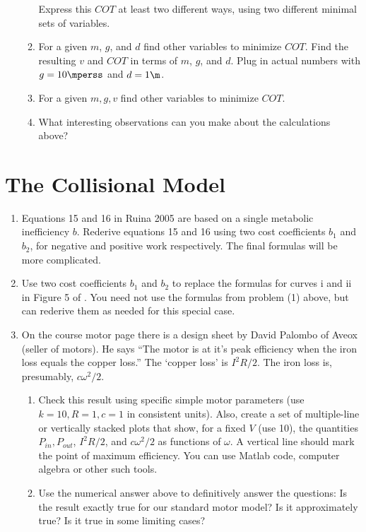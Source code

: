 \begin{enumerate}
\begin{enumerate}
Express this $COT$ at least two different ways, using two different minimal sets
of variables.

\item  For a given $m$, $g$, and $d$ find other variables to minimize $COT$. Find
the resulting $v$ and $COT$ in terms of $m$, $g$, and $d$. Plug in actual numbers with
$g= 10\mperss$ and $d=1\m$.

\item For a given $m,g,v$ find other variables to minimize $COT$. 

\item What interesting observations can you make about the calculations
above?

\end{enumerate}
\end{enumerate}

\newpage
\section{The Collisional Model}

\begin{enumerate}
\item  Equations 15 and 16 in Ruina 2005 \cite{ruina05} are based on a single metabolic inefficiency $b$. Rederive equations 15 and 16 using two cost coefficients $b_1$ and $b_2$, for negative and positive work respectively. The final formulas will be more complicated.

\item Use two cost coefficients $b_{1}$ and $b_{2}$ to replace the formulas for curves i and ii in Figure 5 of \cite{ruina05}. You need not use the formulas from problem (1) above, but can rederive them as needed for this special case.

\item  On the course motor page  there is a design sheet by David Palombo of Aveox (seller
of motors).  He says  ``The motor is at it's peak efficiency when the iron loss equals the copper loss.''  The `copper loss'  is $I^{2}R/2$.  The iron loss is, presumably, $c\omega^{2}/2$.

\begin{enumerate}

\item Check this result using specific simple motor parameters (use $k=10, R=1, c=1$ in consistent units). Also, create a set of multiple-line or vertically stacked plots that show, for a fixed $V$ (use 10), the quantities $P_{in}, P_{out}$, $I^{2}R/2$, and $c\omega^2/2$ as functions of $\omega$.  A vertical line should mark the point of maximum efficiency.  You can
use Matlab code, computer algebra or other such tools.

\item Use the numerical answer above to definitively answer the
questions: Is the result exactly true for our standard motor model? Is it approximately true?  Is it true in some limiting cases?

\end{enumerate}
\end{enumerate}

